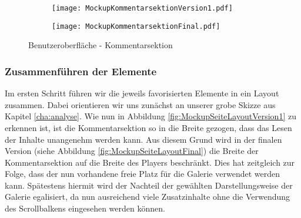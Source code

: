 \begin{figure}[h!]
\begin{subfigure}[c]{\textwidth}
\texttt{[image: MockupKommentarsektionVersion1.pdf]}
\label{fig:MockupKommentarsektionVersion1}
\end{subfigure}
\par\bigskip
\begin{subfigure}[c]{\textwidth}
\texttt{[image: MockupKommentarsektionFinal.pdf]}
\label{fig:MockupKommentarsektionFinal}
\end{subfigure}
\caption{Benutzeroberfläche - Kommentarsektion}
\label{fig:MockupKommentarsektion}
\end{figure}



\subsubsection{Zusammenführen der Elemente}
Im ersten Schritt führen wir die jeweils favorisierten Elemente in ein Layout zusammen. Dabei orientieren wir uns zunächst an unserer grobe Skizze aus Kapitel \ref{cha:analyse}. Wie nun in Abbildung \ref{fig:MockupSeiteLayoutVersion1} zu erkennen ist, ist die Kommentarsektion so in die Breite gezogen, dass das Lesen der Inhalte unangenehm werden kann. Aus diesem Grund wird in der finalen Version (siehe Abbildung \ref{fig:MockupSeiteLayoutFinal}) die Breite der Kommentarsektion auf die Breite des Players beschränkt. Dies hat zeitgleich zur Folge, dass der nun vorhandene freie Platz für die Galerie verwendet werden kann. Spätestens hiermit wird der Nachteil der gewählten Darstellungsweise der Galerie egalisiert, da nun ausreichend viele Zusatzinhalte ohne die Verwendung des Scrollbalkens eingesehen werden können.



